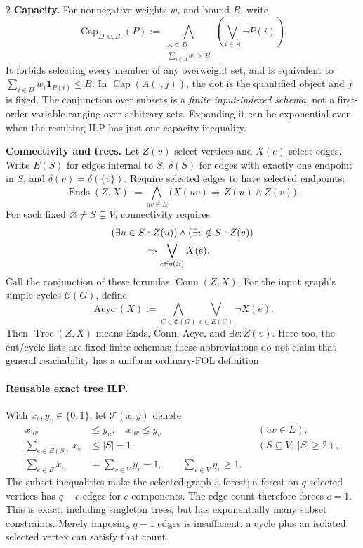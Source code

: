 \documentclass[8pt]{extarticle}
\theoremstyle{definition}
\begin{document}
\begin{multicols*}{2}
\textbf{Capacity.} For nonnegative weights $w_i$ and bound $B$, write
\[
 \operatorname{Cap}_{D,w,B}(P):=
 \bigwedge_{\substack{A\subseteq D\\\sum_{i\in A}w_i>B}}
       \left(\bigvee_{i\in A}\neg P(i)\right).
\]
It forbids selecting every member of any overweight set, and is equivalent
to $\sum_{i\in D}w_i\mathbf1_{P(i)}\le B$. In $\operatorname{Cap}(A(\cdot,j))$,
the dot is the quantified object and $j$ is fixed.
The conjunction over subsets is a \emph{finite input-indexed schema},
not a first-order variable ranging over arbitrary sets. Expanding it can
be exponential even when the resulting ILP has just one capacity inequality.

\textbf{Connectivity and trees.} Let $Z(v)$ select vertices and $X(e)$
select edges. Write $E(S)$ for edges internal to $S$, $\delta(S)$ for edges
with exactly one endpoint in $S$, and $\delta(v)=\delta(\{v\})$.
Require selected edges to have selected endpoints:
\[
 \operatorname{Ends}(Z,X):=
 \bigwedge_{uv\in E}\bigl(X(uv)\Rightarrow Z(u)\land Z(v)\bigr).
\]
For each fixed $\varnothing\ne S\subsetneq V$, connectivity requires
\[
 \begin{aligned}
 &(\exists u\in S:Z(u))\land(\exists v\notin S:Z(v))\\
 &\hspace{12mm}\Rightarrow\bigvee_{e\in\delta(S)}X(e).
 \end{aligned}
\]
Call the conjunction of these formulas $\operatorname{Conn}(Z,X)$.
For the input graph's simple cycles $\mathcal C(G)$, define
\[
 \operatorname{Acyc}(X):=
 \bigwedge_{C\in\mathcal C(G)}\bigvee_{e\in E(C)}\neg X(e).
\]
Then $\operatorname{Tree}(Z,X)$ means Ends, Conn, Acyc, and
$\exists v:Z(v)$. Here too, the cut/cycle lists are fixed finite schemas;
these abbreviations do not claim that general reachability has a uniform
ordinary-FOL definition.

\paragraph{Reusable exact tree ILP.}\label{form:tree-template}
With $x_e,y_v\in\{0,1\}$, let $\mathcal T(x,y)$ denote
\[
\begin{aligned}
 x_{uv}&\le y_u,\quad x_{uv}\le y_v &&(uv\in E),\\
 \sum_{e\in E(S)}x_e&\le |S|-1 &&(S\subseteq V,\ |S|\ge2),\\
 \sum_{e\in E}x_e&=\sum_{v\in V}y_v-1,\qquad
 \sum_{v\in V}y_v\ge1.
\end{aligned}
\]
The subset inequalities make the selected graph a forest; a forest on
$q$ selected vertices has $q-c$ edges for $c$ components. The edge count
therefore forces $c=1$. This is exact, including singleton trees, but has
exponentially many subset constraints. Merely imposing $q-1$ edges is
insufficient: a cycle plus an isolated selected vertex can satisfy that count.


\end{multicols*}
\end{document}
